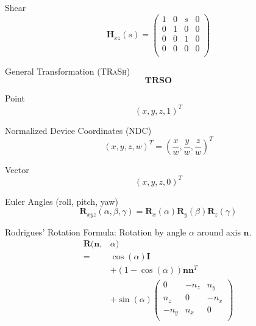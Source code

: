 \documentclass[10pt,a4paper]{article}
\begin{document}
\begin{multicols}{3}
		Shear
		\begin{equation*}
			\mathbf{H}_{xz}(s) = \begin{pmatrix}
				1 & 0 & s & 0 \\
				0 & 1 & 0 & 0 \\
				0 & 0 & 1 & 0 \\
				0 & 0 & 0 & 0 \\
			\end{pmatrix}
		\end{equation*}

		General Transformation (\textsc{TRaSh})
		\begin{equation*}
			\mathbf{TRSO}
		\end{equation*}

		Point
		\begin{equation*}
			(x,y,z,1)^T
		\end{equation*}

		\noindent Normalized Device Coordinates (NDC)
		\begin{equation*}
			(x,y,z,w)^T = (\frac{x}{w},\frac{y}{w},\frac{z}{w})^T
		\end{equation*}

		Vector
		\begin{equation*}
			(x,y,z,0)^T
		\end{equation*}

		Euler Angles (roll, pitch, yaw)
		\begin{equation*}
			\mathbf{R}_{xyz}(\alpha,\beta,\gamma) = \mathbf{R}_x(\alpha)\mathbf{R}_y(\beta)\mathbf{R}_z(\gamma)
		\end{equation*}

		Rodrigues' Rotation Formula: Rotation by angle $\alpha$ around axis $\mathbf{n}$.
		\begin{equation*}
			\begin{split}
				\mathbf{R}(\mathbf{n},&\alpha)\\ =& \cos(\alpha)\mathbf{I} \\&+ (1-\cos(\alpha))\mathbf{n}\mathbf{n}^T \\&+ \sin(\alpha)\begin{pmatrix}
					0 & -n_z & n_y \\
					n_z & 0 & -n_x \\
					-n_y & n_x & 0 \\
				\end{pmatrix}
			\end{split}
		\end{equation*}


\end{multicols}
\end{document}
